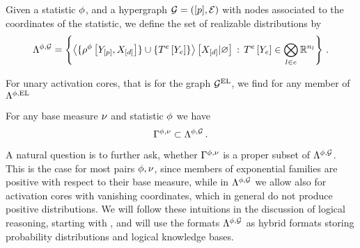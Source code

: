 \begin{definition}
	Given a statistic $\phi$, and a hypergraph $\mathcal{G}=([p],\mathcal{E})$ with nodes associated to the coordinates of the statistic, we define the set of realizable distributions by
	\begin{align*}
		\Lambda^{\phi,\mathcal{G}} = \left\{ \left\langle \{\rho^{\phi}\left[Y_{[p]},X_{[d]}\right]\} \cup \{T^{e}\left[Y_{e}\right]\}\right\rangle \left[ X_{[d]} | \varnothing \right]  \, : \,T^{e}\left[Y_{e}\right] \in\bigotimes_{l\in e}\mathbb{R}^{n_{l}} \right\} \, .
	\end{align*}
\end{definition}

For unary activation cores, that is for the graph $\mathcal{G}^{\mathrm{EL}}$, we find for any member of $\Lambda^{\phi,\mathrm{EL}} $
\begin{center}
	
\end{center}


\begin{corollary}
	For any base measure $\nu$ and statistic $\phi$ we have
		\[ \Gamma^{\phi,\nu} \subset \Lambda^{\phi,\mathcal{G}} \, . \]
\end{corollary}

A natural question is to further ask, whether $\Gamma^{\phi,\nu}$ is a proper subset of $\Lambda^{\phi,\mathcal{G}}$.
This is the case for most pairs $\phi,\nu$, since members of exponential families are positive with respect to their base measure, while in $\Lambda^{\phi,\mathcal{G}}$ we allow also for activation cores with vanishing coordinates, which in general do not produce positive distributions.
We will follow these intuitions in the discussion of logical reasoning, starting with , and will use the formats $\Lambda^{\phi,\mathcal{G}}$ as hybrid formats storing probability distributions and logical knowledge bases.


